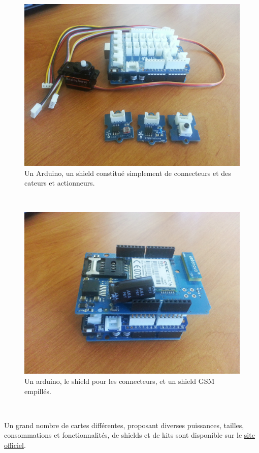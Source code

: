 \documentclass{article}
\begin{document}
\begin{figure}[h!]
    \centering\includegraphics[width=\linewidth/2]{img/arduino_shield.jpg}
    \caption{Un Arduino, un shield constitué simplement de connecteurs et des cateurs et actionneurs.}
\end{figure}

~

\begin{figure}[h!]
    \centering\includegraphics[width=\linewidth/2]{img/gsm.jpg}
    \caption{Un arduino, le shield pour les connecteurs, et un shield GSM empillés.}
\end{figure}

~

Un grand nombre de cartes différentes, proposant diverses puissances, tailles, consommations et fonctionnalités, de shields et de kits sont disponible sur le \hyperref[http://arduino.cc/en/Main/Products]{site officiel}.
\end{document}
